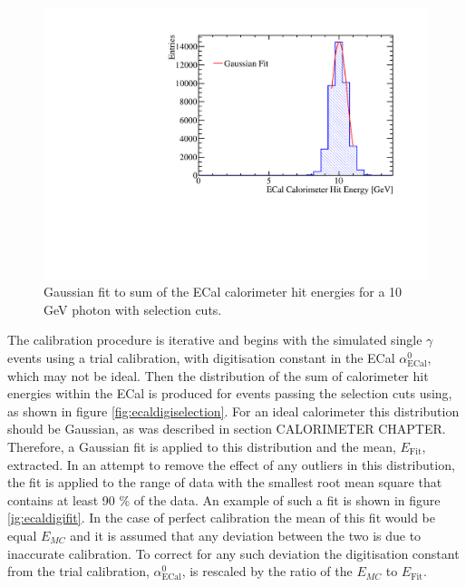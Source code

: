 \begin{figure}
\includegraphics[width=\largefigwidth]{EnergyEstimators/Plots/Calibration/Digitsation/ECal/DigitisationECalFit.pdf}
\caption[Gaussian fit to sum of the ECal calorimeter hit energies for a 10 GeV photon with selection cuts.]{Gaussian fit to sum of the ECal calorimeter hit energies for a 10 GeV photon with selection cuts.}
\label{fig:ecaldigifit}
\end{figure}

The calibration procedure is iterative and begins with the simulated single $\gamma$ events using a trial calibration, with digitisation constant in the ECal $\alpha^{0}_{\text{ECal}}$, which may not be ideal.  Then the distribution of the sum of calorimeter hit energies within the ECal is produced for events passing the selection cuts using, as shown in figure \ref{fig:ecaldigiselection}.  For an ideal calorimeter this distribution should be Gaussian, as was described in section CALORIMETER CHAPTER.  Therefore, a Gaussian fit is applied to this distribution and the mean, $E_{\text{Fit}}$, extracted.  In an attempt to remove the effect of any outliers in this distribution, the fit is applied to the range of data with the smallest root mean square that contains at least 90 \% of the data.  An example of such a fit is shown in figure \ref{ig:ecaldigifit}.  In the case of perfect calibration the mean of this fit would be equal $E_{MC}$ and it is assumed that any deviation between the two is due to inaccurate calibration.  To correct for any such deviation the digitisation constant from the trial calibration, $\alpha^{0}_{\text{ECal}}$, is rescaled by the ratio of the $E_{MC}$ to $E_{\text{Fit}}$.


